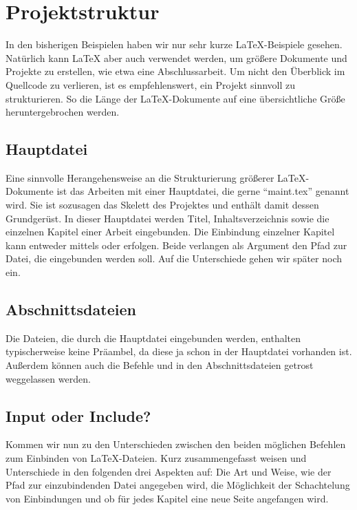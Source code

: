 \section{Projektstruktur}
\label{sec:projektstruktur}
In den bisherigen Beispielen haben wir nur sehr kurze \LaTeX{}-Beispiele gesehen. Natürlich kann \LaTeX{} aber auch verwendet werden, um größere Dokumente und Projekte zu erstellen, wie etwa eine Abschlussarbeit. 
Um nicht den Überblick im Quellcode zu verlieren, ist es empfehlenswert, ein Projekt sinnvoll zu strukturieren. So die Länge der \LaTeX{}-Dokumente auf eine übersichtliche Größe heruntergebrochen werden.

 \subsection{Hauptdatei} Eine sinnvolle Herangehensweise an die Strukturierung größerer \LaTeX{}-Dokumente ist das Arbeiten mit einer Hauptdatei, die gerne \enquote{maint.tex} genannt wird. Sie ist sozusagen das Skelett des Projektes und enthält damit dessen Grundgerüst. In dieser Hauptdatei werden Titel, Inhaltsverzeichnis sowie die einzelnen Kapitel einer Arbeit eingebunden. Die Einbindung einzelner Kapitel kann entweder mittels \texttt{} oder \texttt{} erfolgen. Beide verlangen als Argument den Pfad zur Datei, die eingebunden werden soll. Auf die Unterschiede gehen wir später noch ein.
  
 
 \subsection{Abschnittsdateien}
 Die Dateien, die durch die Hauptdatei eingebunden werden, enthalten typischerweise keine Präambel, da diese ja schon in der Hauptdatei vorhanden ist. Außerdem können auch die Befehle \texttt{} und \texttt{} in den Abschnittsdateien getrost weggelassen werden. 
 
 \subsection{Input oder Include?}
Kommen wir nun zu den Unterschieden zwischen den beiden möglichen Befehlen zum Einbinden von \LaTeX-Dateien. Kurz zusammengefasst weisen \texttt{} und \texttt{} Unterschiede in den folgenden drei Aspekten auf: Die Art und Weise, wie der Pfad zur einzubindenden Datei angegeben wird, die Möglichkeit der Schachtelung von Einbindungen und ob für jedes Kapitel eine neue Seite angefangen wird.
 
